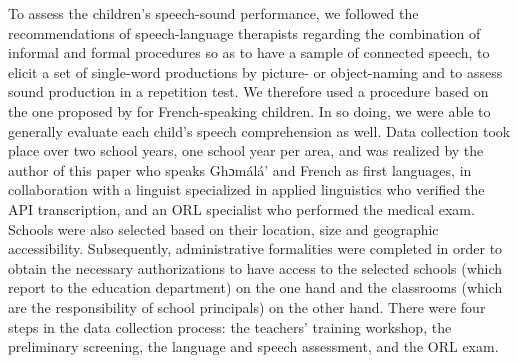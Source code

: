 \documentclass[output=paper,newtxmath,modfonts,nonflat,draftmode]{langsci/langscibook}
\begin{document}
To assess the children’s speech-sound performance, we followed the recommendations of speech-language therapists regarding the combination of informal and formal procedures so as to have a sample of connected speech, to elicit a set of single-word productions by picture- or object-naming and to assess sound production in a repetition test. We therefore used a procedure based on the one proposed by \citet{Maurin-Cherou1993} for French-speaking children. In so doing, we were able to generally evaluate each child’s speech comprehension as well. Data collection took place over two school years, one school year per area, and was realized by the author of this paper who speaks Ghɔmálá’ and French as first languages, in collaboration with a linguist specialized in applied linguistics who verified the API transcription, and an ORL specialist who performed the medical exam. Schools were also selected based on their location, size and geographic accessibility. Subsequently, administrative formalities were completed in order to obtain the necessary authorizations to have access to the selected schools (which report to the education department) on the one hand and the classrooms (which are the responsibility of school principals) on the other hand. There were four steps in the data collection process: the teachers’ training workshop, the preliminary screening, the language and speech assessment, and the ORL exam.
\end{document}
